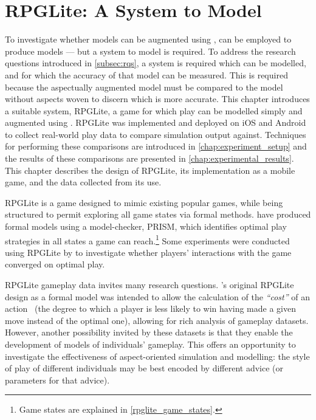 \chapter{RPGLite: A System to Model}\label{chap:rpglite}


To investigate whether models can be augmented using \aop{}, \pdsf{} can be
employed to produce \aspectoriented{} models --- but a system to model is
required. To address the research questions introduced in \cref{subsec:rqs}, a
system is required which can be modelled, and for which the accuracy of that
model can be measured. This is required because the aspectually augmented model
must be compared to the model without aspects woven to discern which is more
accurate. This chapter introduces a suitable system, RPGLite, a game for which
play can be modelled simply and augmented using \aop{}. RPGLite was implemented
and deployed on iOS and Android to collect real-world play data to compare
simulation output against. Techniques for performing these comparisons are
introduced in \cref{chap:experiment_setup} and the results of these comparisons
are presented in \cref{chap:experimental_results}. This chapter describes the
design of RPGLite, its implementation as a mobile game, and the data collected
from its use.

RPGLite is a game designed to mimic existing popular games, while being
structured to permit exploring all game states via formal methods.
\citet{kavanagh2020} have produced formal models using a model-checker, PRISM,
which identifies optimal play strategies in all states a game can
reach.\footnote{Game states are explained in \cref{rpglite_game_states}.} Some
experiments were conducted using RPGLite by \citet{kavanagh2021thesis} to
investigate whether players' interactions with the game converged on optimal
play.

RPGLite gameplay data invites many research questions.
\citeauthor{kavanagh2020}'s original RPGLite design as a formal model was
intended to allow the calculation of the \emph{``cost''} of an
action~\cite{kavanagh2020,kavanagh2021thesis} (the degree to which a player is
less likely to win having made a given move instead of the optimal one),
allowing for rich analysis of gameplay datasets. However, another possibility
invited by these datasets is that they enable the development of models of
individuals' gameplay. This offers an opportunity to investigate the
effectiveness of aspect-oriented simulation and modelling: the style of play of
different individuals may be best encoded by different advice (or parameters for
that advice).

